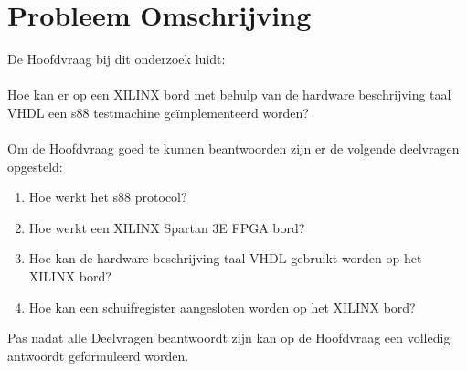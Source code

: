 \chapter{Probleem Omschrijving}


De Hoofdvraag bij dit onderzoek luidt:
\\\\
Hoe kan er op een XILINX bord met behulp van de hardware beschrijving taal VHDL een s88 testmachine geïmplementeerd worden?
\\\\


Om de Hoofdvraag goed te kunnen beantwoorden zijn er de volgende deelvragen opgesteld:

\begin{enumerate}
	\item Hoe werkt het s88 protocol?
	\item Hoe werkt een XILINX Spartan 3E FPGA bord?
	\item Hoe kan de hardware beschrijving taal VHDL gebruikt worden op het XILINX bord?
	\item Hoe kan een schuifregister aangesloten worden op het XILINX bord?
\end{enumerate}

Pas nadat alle Deelvragen beantwoordt zijn kan op de Hoofdvraag een volledig antwoordt geformuleerd worden.